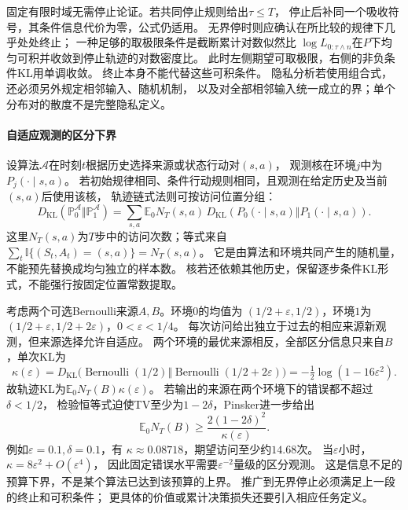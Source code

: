 固定有限时域无需停止论证。若共同停止规则给出\(\tau\leq T\)，
停止后补同一个吸收符号，其条件信息代价为零，公式仍适用。
无界停时则应确认在所比较的规律下几乎处处终止；
一种足够的取极限条件是截断累计对数似然比
\(\log L_{0:\tau\wedge n}\)在\(P\)下均匀可积并收敛到停止轨迹的对数密度比。
此时左侧期望可取极限，右侧的非负条件KL用单调收敛。
终止本身不能代替这些可积条件。
隐私分析若使用组合式，还必须另外规定相邻输入、随机机制，
以及对全部相邻输入统一成立的界；单个分布对的散度不是完整隐私定义。

\paragraph{自适应观测的区分下界}
\label{sec:information-adaptive-lower-bounds}

设算法\(\mathcal A\)在时刻\(t\)根据历史选择来源或状态行动对\((s,a)\)，
观测核在环境\(j\)中为\(P_j(\cdot\mid s,a)\)。
若初始规律相同、条件行动规则相同，且观测在给定历史及当前\((s,a)\)后使用该核，
轨迹链式法则可按访问位置分组：
\[
  D_{\mathrm{KL}}(\mathbb P_0^{\mathcal A}\Vert\mathbb P_1^{\mathcal A})
  =\sum_{s,a}\mathbb E_0N_T(s,a)\,
      D_{\mathrm{KL}}(P_0(\cdot\mid s,a)\Vert P_1(\cdot\mid s,a)).
\]
这里\(N_T(s,a)\)为\(T\)步中的访问次数；等式来自
\(\sum_t\mathbb I\{(S_t,A_t)=(s,a)\}=N_T(s,a)\)。
它是由算法和环境共同产生的随机量，不能预先替换成均匀独立的样本数。
核若还依赖其他历史，保留逐步条件KL形式，不能强行按固定位置常数提取。

考虑两个可选Bernoulli来源\(A,B\)。环境\(0\)的均值为
\((1/2+\varepsilon,1/2)\)，环境\(1\)为
\((1/2+\varepsilon,1/2+2\varepsilon)\)，\(0<\varepsilon<1/4\)。
每次访问给出独立于过去的相应来源新观测，但来源选择允许自适应。
两个环境的最优来源相反，全部区分信息只来自\(B\)，单次KL为
\[
  \kappa(\varepsilon)
  =D_{\mathrm{KL}}\bigl(\operatorname{Bernoulli}(1/2)
             \Vert\operatorname{Bernoulli}(1/2+2\varepsilon)\bigr)
  =-\tfrac12\log(1-16\varepsilon^2).
\]
故轨迹KL为\(\mathbb E_0N_T(B)\kappa(\varepsilon)\)。
若输出的来源在两个环境下的错误都不超过\(\delta<1/2\)，
检验恒等式迫使TV至少为\(1-2\delta\)，Pinsker进一步给出
\[
  \mathbb E_0N_T(B)\geq
  \frac{2(1-2\delta)^2}{\kappa(\varepsilon)}.
\]
例如\(\varepsilon=0.1,\delta=0.1\)，有
\(\kappa\approx0.08718\)，期望访问至少约\(14.68\)次。
当\(\varepsilon\)小时，\(\kappa=8\varepsilon^2+O(\varepsilon^4)\)，
因此固定错误水平需要\(\varepsilon^{-2}\)量级的区分观测。
这是信息不足的预算下界，不是某个算法已达到该预算的上界。
推广到无界停止必须满足上一段的终止和可积条件；
更具体的价值或累计决策损失还要引入相应任务定义。

